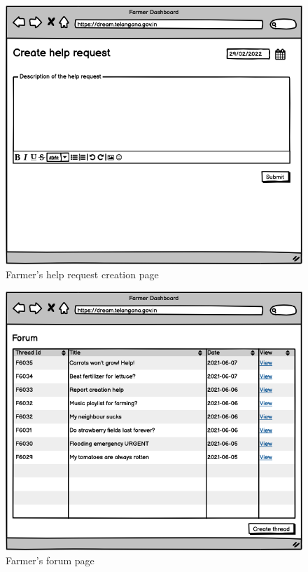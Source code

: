 \documentclass[10pt]{article} %
\begin{document}
\begin{figure}[h]
    \centering
    \includegraphics[scale=0.4]{images/uimockups/f_helprequest.png}
    \caption{Farmer's help request creation page}
    \label{fig:ui_f_helprequest}
\end{figure}
\begin{figure}[h]
    \centering
    \includegraphics[scale=0.4]{images/uimockups/f_forum.png}
    \caption{Farmer's forum page}
    \label{fig:ui_f_forum}
\end{figure}
\end{document}
